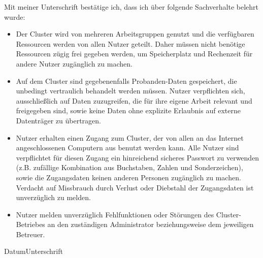 \documentclass[paper=a4]{scrartcl}
\begin{document}
\vspace{1cm}
\noindent Mit meiner Unterschrift bestätige ich, dass ich über folgende
Sachverhalte belehrt wurde:
\begin{itemize}
  \item Der Cluster wird von mehreren Arbeitsgruppen genutzt und die verfügbaren
    Ressourcen werden von allen Nutzer geteilt. Daher müssen nicht
    benötige Ressourcen zügig frei gegeben werden, um Speicherplatz und
    Rechenzeit für andere Nutzer zugänglich zu machen.
  \item Auf dem Cluster sind gegebenenfalls Probanden-Daten gespeichert, die
    unbedingt vertraulich behandelt werden müssen. Nutzer verpflichten sich,
    ausschließlich auf Daten zuzugreifen, die für ihre eigene Arbeit relevant
    und freigegeben sind, sowie keine Daten ohne explizite Erlaubnis auf externe
    Datenträger zu übertragen.
  \item Nutzer erhalten einen Zugang zum Cluster, der von allen an das Internet
    angeschlossenen Computern aus benutzt werden kann. Alle Nutzer sind
    verpflichtet für diesen Zugang ein hinreichend sicheres Passwort zu
    verwenden (z.B. zufällige Kombination aus Buchstaben, Zahlen und
    Sonderzeichen), sowie die Zugangsdaten keinen anderen Personen zugänglich zu
    machen. Verdacht auf Missbrauch durch Verlust oder Diebstahl der
    Zugangsdaten ist unverzüglich zu melden.
  \item Nutzer melden unverzüglich Fehlfunktionen oder Störungen des
    Cluster-Betriebes an den zuständigen Administrator beziehungsweise dem
    jeweiligen Betreuer.


\end{itemize}
\vspace{3cm}

\hspace{2cm}Datum\hfill Unterschrift\hspace{2cm}
\end{document}
